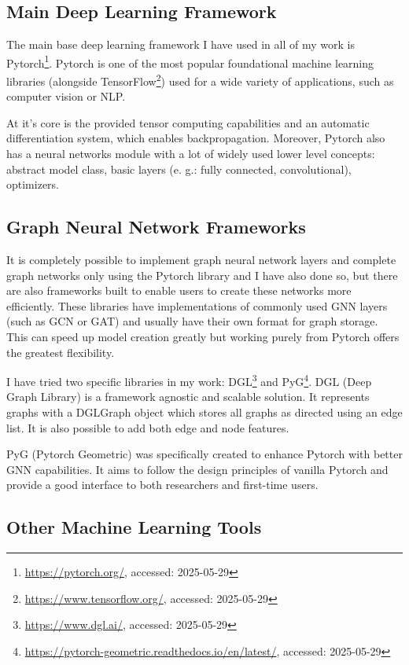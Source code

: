 	\subsection{Main Deep Learning Framework}
	
	The main base deep learning framework I have used in all of my work is Pytorch\footnote{\url{https://pytorch.org/}, accessed: 2025-05-29}. Pytorch is one of the most popular foundational machine learning libraries (alongside TensorFlow\footnote{\url{https://www.tensorflow.org/}, accessed: 2025-05-29}) used for a wide variety of applications, such as computer vision or NLP. 
	
	At it's core is the provided tensor computing capabilities and an automatic differentiation system, which enables backpropagation. Moreover, Pytorch also has a neural networks module with a lot of widely used lower level concepts: abstract model class, basic layers (e. g.: fully connected, convolutional), optimizers.
	
	\subsection{Graph Neural Network Frameworks}
	
	It is completely possible to implement graph neural network layers and complete graph networks only using the Pytorch library and I have also done so, but there are also frameworks built to enable users to create these networks more efficiently. These libraries have implementations of commonly used GNN layers (such as GCN or GAT) and usually have their own format for graph storage. This can speed up model creation greatly but working purely from Pytorch offers the greatest flexibility.
	
	I have tried two specific libraries in my work: DGL\footnote{\url{https://www.dgl.ai/}, accessed: 2025-05-29} and PyG\footnote{\url{https://pytorch-geometric.readthedocs.io/en/latest/}, accessed: 2025-05-29}. DGL (Deep Graph Library) is a framework agnostic and scalable solution. It represents graphs with a DGLGraph object which stores all graphs as directed using an edge list. It is also possible to add both edge and node features.
	
	PyG (Pytorch Geometric) was specifically created to enhance Pytorch with better GNN capabilities. It aims to follow the design principles of vanilla Pytorch and provide a good interface to both researchers and first-time users.  
	
	\subsection{Other Machine Learning Tools}
	
